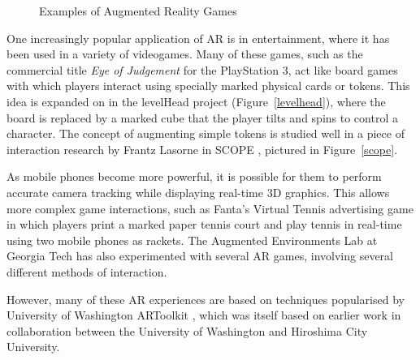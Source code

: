 \documentclass[a4paper,10pt]{article}
\begin{document}
\begin{figure}[t]
    \quad
    \caption{Examples of Augmented Reality Games}
\end{figure}

One increasingly popular application of AR is in entertainment, where it has been used in a variety of videogames. Many of these games, such as the commercial title \textit{Eye of Judgement} \cite{eyeofjudgement} for the PlayStation 3, act like board games with which players interact using specially marked physical cards or tokens. This idea is expanded on in the levelHead \cite{levelhead} project (Figure~\ref{levelhead}), where the board is replaced by a marked cube that the player tilts and spins to control a character. The concept of augmenting simple tokens is studied well in a piece of interaction research by Frantz Lasorne in SCOPE \cite{scope}, pictured in Figure~\ref{scope}.

As mobile phones become more powerful, it is possible for them to perform accurate camera tracking while displaying real-time 3D graphics. This allows more complex game interactions, such as Fanta's Virtual Tennis\cite{fantatennis} advertising game in which players print a marked paper tennis court and play tennis in real-time using two mobile phones as rackets. The Augmented Environments Lab at Georgia Tech has also experimented with several AR games, involving several different methods of interaction.

However, many of these AR experiences are based on techniques popularised by University of Washington ARToolkit \cite{artk}, which was itself based on earlier work \cite{artkpaper} in collaboration between the University of Washington and Hiroshima City University. 
\end{document}
